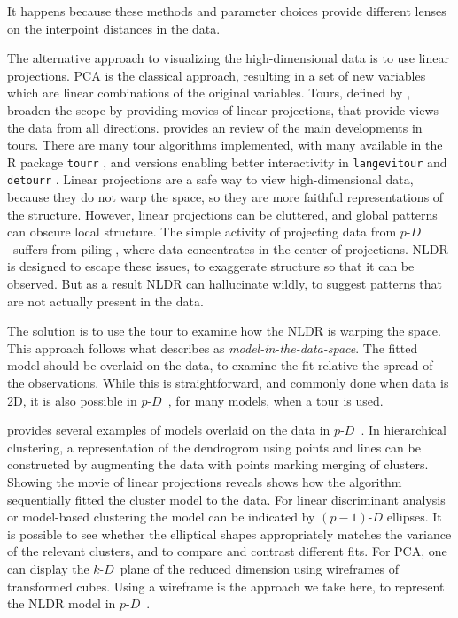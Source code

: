 \documentclass[
  12pt]{article}
\newcommand\pD{$p\text{-}D$\ }
\newcommand\kD{$k\text{-}D$\ }
\begin{document}
It happens because these methods and parameter choices provide different
lenses on the interpoint distances in the data.

The alternative approach to visualizing the high-dimensional data is to
use linear projections. PCA is the classical approach, resulting in a
set of new variables which are linear combinations of the original
variables. Tours, defined by \citet{lee2021}, broaden the scope by
providing movies of linear projections, that provide views the data from
all directions. \citet{lee2021} provides an review of the main
developments in tours. There are many tour algorithms implemented, with
many available in the R package \texttt{tourr} \citep{wickham2011}, and
versions enabling better interactivity in \texttt{langevitour}
\citep{harisson2024} and \texttt{detourr} \citep{hart2022}. Linear
projections are a safe way to view high-dimensional data, because they
do not warp the space, so they are more faithful representations of the
structure. However, linear projections can be cluttered, and global
patterns can obscure local structure. The simple activity of projecting
data from \pD suffers from piling \citep{laa2022}, where data
concentrates in the center of projections. NLDR is designed to escape
these issues, to exaggerate structure so that it can be observed. But as
a result NLDR can hallucinate wildly, to suggest patterns that are not
actually present in the data.

The solution is to use the tour to examine how the NLDR is warping the
space. This approach follows what \citet{wickham2015} describes as
\emph{model-in-the-data-space}. The fitted model should be overlaid on
the data, to examine the fit relative the spread of the observations.
While this is straightforward, and commonly done when data is 2D, it is
also possible in \pD, for many models, when a tour is used.

\citet{wickham2015} provides several examples of models overlaid on the
data in \pD. In hierarchical clustering, a representation of the
dendrogrom using points and lines can be constructed by augmenting the
data with points marking merging of clusters. Showing the movie of
linear projections reveals shows how the algorithm sequentially fitted
the cluster model to the data. For linear discriminant analysis or
model-based clustering the model can be indicated by \((p-1)\text{-}D\)
ellipses. It is possible to see whether the elliptical shapes
appropriately matches the variance of the relevant clusters, and to
compare and contrast different fits. For PCA, one can display the
\kD plane of the reduced dimension using wireframes of transformed
cubes. Using a wireframe is the approach we take here, to represent the
NLDR model in \pD.
\end{document}

